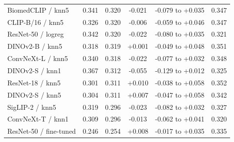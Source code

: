 \begin{tabular}{@{}lccccc@{}}
BiomedCLIP / knn5 & 0.341 & 0.320 & -0.021 & -0.079 to +0.035 & 0.347\\
CLIP-B/16 / knn5 & 0.326 & 0.320 & -0.006 & -0.059 to +0.046 & 0.347\\
ResNet-50 / logreg & 0.342 & 0.320 & -0.022 & -0.080 to +0.035 & 0.321\\
DINOv2-B / knn5 & 0.318 & 0.319 & +0.001 & -0.049 to +0.048 & 0.351\\
ConvNeXt-L / knn5 & 0.340 & 0.318 & -0.022 & -0.077 to +0.032 & 0.348\\
DINOv2-S / knn1 & 0.367 & 0.312 & -0.055 & -0.129 to +0.012 & 0.325\\
ResNet-18 / knn5 & 0.301 & 0.311 & +0.010 & -0.038 to +0.058 & 0.352\\
DINOv2-S / knn5 & 0.304 & 0.311 & +0.007 & -0.047 to +0.058 & 0.342\\
SigLIP-2 / knn5 & 0.319 & 0.296 & -0.023 & -0.082 to +0.032 & 0.327\\
ConvNeXt-T / knn1 & 0.309 & 0.296 & -0.013 & -0.062 to +0.041 & 0.320\\
ResNet-50 / fine-tuned & 0.246 & 0.254 & +0.008 & -0.017 to +0.035 & 0.335\\
\bottomrule\end{tabular}
